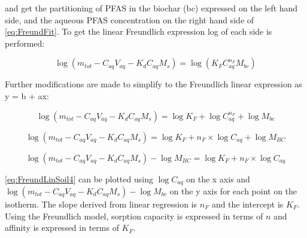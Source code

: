 and get the partitioning of PFAS in the biochar (bc) expressed on the left hand side, and the aqueous PFAS concentration on the right hand side of \cref{eq:FreundFit}. To get the linear Freundlich expression log of each side is performed:

\begin{equation} \label{eq:FreundLinSoil1}
   \log (m_{tot} - C_{aq}V_{aq} - K_dC_{aq}M_s) = \log (K_{F}C_{aq}^{n_F}M_{bc})
\end{equation}

Further modifications are made to simplify to the Freundlich linear expression as y = b + ax:

\begin{equation} \label{eq:FreundLinSoil2}
    \log (m_{tot} - C_{aq}V_{aq} - K_dC_{aq}M_s) = \log K_{F} + \log C_{aq}^{n_F} + \log M_{bc}
\end{equation}

\begin{equation} \label{eq:FreundLinSoil3}
    \log (m_{tot} - C_{aq}V_{aq} - K_dC_{aq}M_s) = \log K_{F} + n_F \times \log C_{aq} + \log M_{BC}
\end{equation}

\begin{equation} \label{eq:FreundLinSoil4}
    \log (m_{tot} - C_{aq}V_{aq} - K_dC_{aq}M_s) - \log M_{BC} = \log K_{F} + n_F \times \log C_{aq}  
\end{equation}

\cref{eq:FreundLinSoil4} can be plotted using $\log C_{aq}$ on the x axis and $\log (m_{tot} - C_{aq}V_{aq} - K_dC_{aq}M_s) - \log M_{bc}$ on the y axis for each point on the isotherm. The slope derived from linear regression is $n_F$ and the intercept is $K_F$. Using the Freundlich model, sorption capacity is expressed in terms of \(n\) and affinity is expressed in terms of \(K_F\). 

